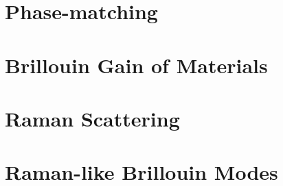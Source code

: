 \section{Phase-matching}
\label{sec:Introduction:Phase-matching}


\section{Brillouin Gain of Materials}
\label{subsec:Introduction:Gain}


\section{Raman Scattering}
\label{sec:Introduction:Raman}


\section{Raman-like Brillouin Modes}
\label{sec:Introduction:Raman-like}


\clearpage
\thispagestyle{empty}
\null
\newpage
